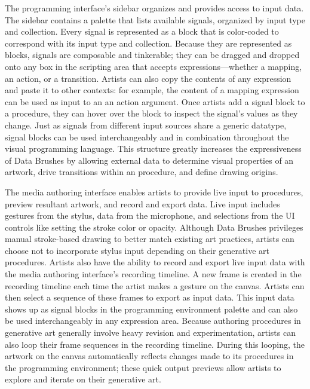 \documentclass{sigchi}
\begin{document}
The programming interface's sidebar organizes and provides access to input data. The sidebar contains a palette that lists available signals, organized by input type and collection. Every signal is represented as a block that is color-coded to correspond with its input type and collection. Because they are represented as blocks, signals are composable and tinkerable; they can be dragged and dropped onto any box in the scripting area that accepts expressions---whether a mapping, an action, or a transition.  Artists can also copy the contents of any expression and paste it to other contexts: for example, the content of a mapping expression can be used as input to an an action argument. Once artists add a signal block to a procedure, they can hover over the block to inspect the signal's values as they change. Just as signals from different input sources share a generic datatype, signal blocks can be used interchangeably and in combination throughout the visual programming language. This structure greatly increases the expressiveness of Data Brushes by allowing external data to determine visual properties of an artwork, drive transitions within an procedure, and define drawing origins.

The media authoring interface enables artists to provide live input to procedures, preview resultant artwork, and record and export data. Live input includes gestures from the stylus, data from the microphone, and selections from the UI controls like setting the stroke color or opacity. Although Data Brushes privileges manual stroke-based drawing to better match existing art practices, artists can choose not to incorporate stylus input depending on their generative art procedures. Artists also have the ability to record and export live input data with the media authoring interface's recording timeline. A new frame is created in the recording timeline each time the artist makes a gesture on the canvas. Artists can then select a sequence of these frames to export as input data. This input data shows up as signal blocks in the programming environment palette and can also be used interchangeably in any expression area. Because authoring procedures in generative art generally involve heavy revision and experimentation, artists can also loop their frame sequences in the recording timeline. During this looping, the artwork on the canvas automatically reflects changes made to its procedures in the programming environment; these quick output previews allow artists to explore and iterate on their generative art.
\end{document}

